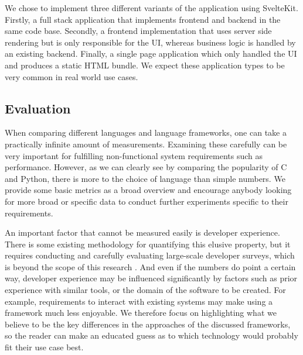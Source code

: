 We chose to implement three different variants of the application using SvelteKit. Firstly, a full stack application that implements frontend and backend in the same code base. Secondly, a frontend implementation that uses server side rendering but is only responsible for the UI, whereas business logic is handled by an existing backend. Finally, a single page application which only handled the UI and produces a static HTML bundle. We expect these application types to be very common in real world use cases.

\subsection{Evaluation}
When comparing different languages and language frameworks, one can take a practically infinite amount of measurements. Examining these carefully can be very important for fulfilling non-functional system requirements such as performance. However, as we can clearly see by comparing the popularity of C and Python, there is more to the choice of language than simple numbers. We provide some basic metrics as a broad overview and encourage anybody looking for more broad or specific data to conduct further experiments specific to their requirements.

An important factor that cannot be measured easily is developer experience. There is some existing methodology for quantifying this elusive property, but it requires conducting and carefully evaluating large-scale developer surveys, which is beyond the scope of this research \cite{morales_programmer_2019}. And even if the numbers do point a certain way, developer experience may be influenced significantly by factors such as prior experience with similar tools, or the domain of the software to be created. For example, requirements to interact with existing systems may make using a framework much less enjoyable. We therefore focus on highlighting what we believe to be the key differences in the approaches of the discussed frameworks, so the reader can make an educated guess as to which technology would probably fit their use case best.


